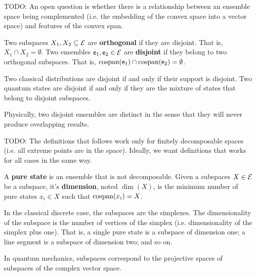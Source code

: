 \begin{remark}
	TODO: An open question is whether there is a relationship between an ensemble space being complemented (i.e. the embedding of the convex space into a vector space) and features of the convex span.
\end{remark}

\begin{defn}
	Two subspaces $X_1, X_2 \subseteq \mathcal{E}$ are \textbf{orthogonal} if they are disjoint. That is, $X_1 \cap X_2 = \emptyset$. Two ensembles $\mathsf{e}_1, \mathsf{e}_2 \in \mathcal{E}$ are \textbf{disjoint} if they belong to two orthogonal subspaces. That is, $\mathrm{cospan}(\mathsf{e}_1) \cap \mathrm{cospan}(\mathsf{e}_2) = \emptyset$.
\end{defn}

\begin{remark}
	Two classical distributions are disjoint if and only if their support is disjoint. Two quantum states are disjoint if and only if they are the mixture of states that belong to disjoint subspaces.
	
	Physically, two disjoint ensembles are distinct in the sense that they will never produce overlapping results.
\end{remark}

\begin{remark}
	TODO: The definitions that follows work only for finitely decomposable spaces (i.e. all extreme points are in the space). Ideally, we want definitions that works for all cases in the same way.
\end{remark}

\begin{defn}
	A \textbf{pure state} is an ensemble that is not decomposable. Given a subspaces $X \in \mathcal{E}$ be a subspace, it's \textbf{dimension}, noted $\dim(X)$, is the minimum number of pure states $x_i \in X$ such that $\mathrm{cospan}(x_i) = X$.
\end{defn}

\begin{remark}
	In the classical discrete case, the subspaces are the simplexes. The dimensionality of the subspace is the number of vertices of the simplex (i.e. dimensionality of the simplex plus one). That is, a single pure state is a subspace of dimension one; a line segment is a subspace of dimension two; and so on.
	
	In quantum mechanics, subspaces correspond to the projective spaces of subspaces of the complex vector space.
\end{remark}

